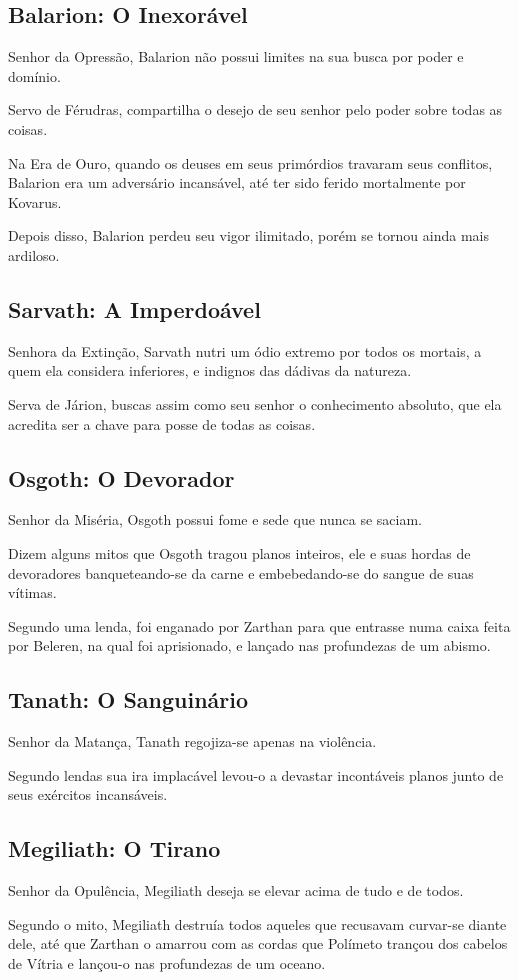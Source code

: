 \documentclass[letterpaper,twocolumn,openany]{dndbook}
\begin{document}
	\subsection{Balarion: O Inexorável}
	Senhor da Opressão, Balarion não possui limites na sua busca por poder e domínio.
	\par Servo de Férudras, compartilha o desejo de seu senhor pelo poder sobre todas as coisas.
	\par Na Era de Ouro, quando os deuses em seus primórdios travaram seus conflitos, Balarion era um adversário incansável, até ter sido ferido mortalmente por Kovarus.
	\par Depois disso, Balarion perdeu seu vigor ilimitado, porém se tornou ainda mais ardiloso.
	
	\subsection{Sarvath: A Imperdoável}
	Senhora da Extinção, Sarvath nutri um ódio extremo por todos os mortais, a quem ela considera inferiores, e indignos das dádivas da natureza.
	\par Serva de Járion, buscas assim como seu senhor o conhecimento absoluto, que ela acredita ser a chave para posse de todas as coisas.
	
	\subsection{Osgoth: O Devorador}
	Senhor da Miséria, Osgoth possui fome e sede que nunca se saciam.
	\par Dizem alguns mitos que Osgoth tragou planos inteiros, ele e suas hordas de devoradores banqueteando-se da carne e embebedando-se do sangue de suas vítimas.
	\par Segundo uma lenda, foi enganado por Zarthan para que entrasse numa caixa feita por Beleren, na qual foi aprisionado, e lançado nas profundezas de um abismo.
	
	\subsection{Tanath: O Sanguinário}
	Senhor da Matança, Tanath regojiza-se apenas na violência.
	\par Segundo lendas sua ira implacável levou-o a devastar incontáveis planos junto de seus exércitos incansáveis.
	
	\subsection{Megiliath: O Tirano}
	Senhor da Opulência, Megiliath deseja se elevar acima de tudo e de todos.
	\par Segundo o mito, Megiliath destruía todos aqueles que recusavam curvar-se diante dele, até que Zarthan o amarrou com as cordas que Polímeto trançou dos cabelos de Vítria e lançou-o nas profundezas de um oceano.
	
\end{document}

